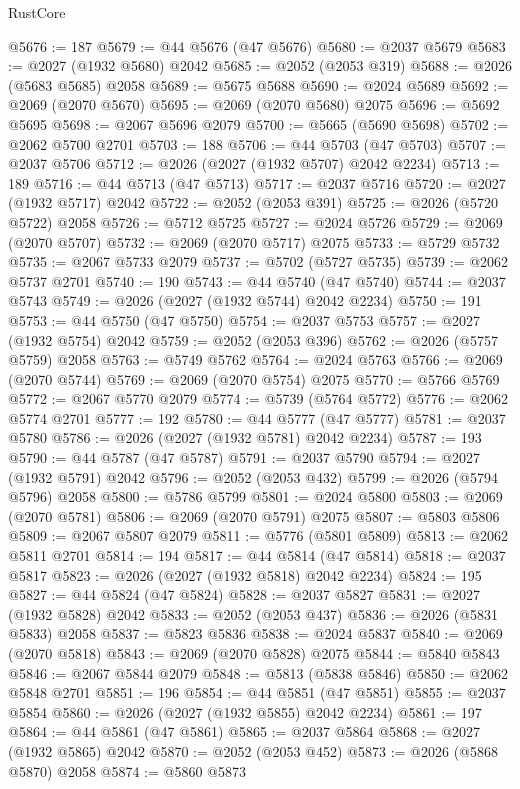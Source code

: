 \begin{lexlean}{RustCore}
\begin{coremodule}
@5676 := 187
@5679 := @44 @5676 (@47 @5676)
@5680 := @2037 @5679
@5683 := @2027 (@1932 @5680) @2042
@5685 := @2052 (@2053 @319)
@5688 := @2026 (@5683 @5685) @2058
@5689 := @5675 @5688
@5690 := @2024 @5689
@5692 := @2069 (@2070 @5670)
@5695 := @2069 (@2070 @5680) @2075
@5696 := @5692 @5695
@5698 := @2067 @5696 @2079
@5700 := @5665 (@5690 @5698)
@5702 := @2062 @5700 @2701
@5703 := 188
@5706 := @44 @5703 (@47 @5703)
@5707 := @2037 @5706
@5712 := @2026 (@2027 (@1932 @5707) @2042 @2234)
@5713 := 189
@5716 := @44 @5713 (@47 @5713)
@5717 := @2037 @5716
@5720 := @2027 (@1932 @5717) @2042
@5722 := @2052 (@2053 @391)
@5725 := @2026 (@5720 @5722) @2058
@5726 := @5712 @5725
@5727 := @2024 @5726
@5729 := @2069 (@2070 @5707)
@5732 := @2069 (@2070 @5717) @2075
@5733 := @5729 @5732
@5735 := @2067 @5733 @2079
@5737 := @5702 (@5727 @5735)
@5739 := @2062 @5737 @2701
@5740 := 190
@5743 := @44 @5740 (@47 @5740)
@5744 := @2037 @5743
@5749 := @2026 (@2027 (@1932 @5744) @2042 @2234)
@5750 := 191
@5753 := @44 @5750 (@47 @5750)
@5754 := @2037 @5753
@5757 := @2027 (@1932 @5754) @2042
@5759 := @2052 (@2053 @396)
@5762 := @2026 (@5757 @5759) @2058
@5763 := @5749 @5762
@5764 := @2024 @5763
@5766 := @2069 (@2070 @5744)
@5769 := @2069 (@2070 @5754) @2075
@5770 := @5766 @5769
@5772 := @2067 @5770 @2079
@5774 := @5739 (@5764 @5772)
@5776 := @2062 @5774 @2701
@5777 := 192
@5780 := @44 @5777 (@47 @5777)
@5781 := @2037 @5780
@5786 := @2026 (@2027 (@1932 @5781) @2042 @2234)
@5787 := 193
@5790 := @44 @5787 (@47 @5787)
@5791 := @2037 @5790
@5794 := @2027 (@1932 @5791) @2042
@5796 := @2052 (@2053 @432)
@5799 := @2026 (@5794 @5796) @2058
@5800 := @5786 @5799
@5801 := @2024 @5800
@5803 := @2069 (@2070 @5781)
@5806 := @2069 (@2070 @5791) @2075
@5807 := @5803 @5806
@5809 := @2067 @5807 @2079
@5811 := @5776 (@5801 @5809)
@5813 := @2062 @5811 @2701
@5814 := 194
@5817 := @44 @5814 (@47 @5814)
@5818 := @2037 @5817
@5823 := @2026 (@2027 (@1932 @5818) @2042 @2234)
@5824 := 195
@5827 := @44 @5824 (@47 @5824)
@5828 := @2037 @5827
@5831 := @2027 (@1932 @5828) @2042
@5833 := @2052 (@2053 @437)
@5836 := @2026 (@5831 @5833) @2058
@5837 := @5823 @5836
@5838 := @2024 @5837
@5840 := @2069 (@2070 @5818)
@5843 := @2069 (@2070 @5828) @2075
@5844 := @5840 @5843
@5846 := @2067 @5844 @2079
@5848 := @5813 (@5838 @5846)
@5850 := @2062 @5848 @2701
@5851 := 196
@5854 := @44 @5851 (@47 @5851)
@5855 := @2037 @5854
@5860 := @2026 (@2027 (@1932 @5855) @2042 @2234)
@5861 := 197
@5864 := @44 @5861 (@47 @5861)
@5865 := @2037 @5864
@5868 := @2027 (@1932 @5865) @2042
@5870 := @2052 (@2053 @452)
@5873 := @2026 (@5868 @5870) @2058
@5874 := @5860 @5873

\end{coremodule}
\end{lexlean}
